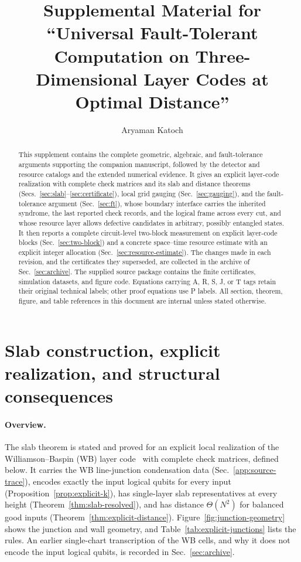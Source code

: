 \documentclass[aps,prx,reprint,superscriptaddress,nofootinbib,floatfix,longbibliography]{revtex4-2}
\theoremstyle{definition}
\begin{document}
\title{Supplemental Material for ``Universal Fault-Tolerant Computation on Three-Dimensional Layer Codes at Optimal Distance''}
\author{Aryaman Katoch}
\begin{abstract}
This supplement contains the complete geometric, algebraic, and fault-tolerance
arguments supporting the companion manuscript, followed by the detector and
resource catalogs and the extended numerical evidence.  It gives an explicit
layer-code realization with complete check matrices and its slab and distance
theorems (Secs.~\ref{sec:slab}--\ref{sec:certificate}), local grid gauging
(Sec.~\ref{sec:gauging}), and the fault-tolerance argument
(Sec.~\ref{sec:ft}), whose boundary interface carries the inherited syndrome,
the last reported check records, and the logical frame across every cut, and
whose resource layer allows defective candidates in arbitrary, possibly
entangled states.  It then reports a complete circuit-level two-block
measurement on explicit layer-code blocks (Sec.~\ref{sec:two-block}) and a
concrete space--time resource estimate with an explicit integer allocation
(Sec.~\ref{sec:resource-estimate}).  The changes made in each revision, and
the certificates they superseded, are collected in the archive of
Sec.~\ref{sec:archive}.  The supplied source package contains the finite
certificates, simulation datasets, and figure code.
Equations carrying A, R, S, J, or T tags retain their original technical labels;
other proof equations use P labels. All section, theorem, figure, and table
references in this document are internal unless stated otherwise.
\end{abstract}
\maketitle
\raggedbottom
\tableofcontents
\clearpage
\section{Slab construction, explicit realization, and structural consequences}
\label{sec:slab}

\paragraph{Overview.}
The slab theorem is stated and proved for an explicit local realization of
the Williamson--Baspin (WB) layer code~\cite{WilliamsonBaspinLayerCodes} with
complete check matrices, defined below.  It carries the WB line-junction
condensation data (Sec.~\ref{app:source-trace}), encodes exactly the input
logical qubits for every input (Proposition~\ref{prop:explicit-k}), has
single-layer slab representatives at every height
(Theorem~\ref{thm:slab-resolved}), and has distance $\Theta(N^2)$ for balanced
good inputs (Theorem~\ref{thm:explicit-distance}).
Figure~\ref{fig:junction-geometry} shows the junction and wall geometry, and
Table~\ref{tab:explicit-junctions} lists the rules.  An earlier single-chart
transcription of the WB cells, and why it does not encode the input logical
qubits, is recorded in Sec.~\ref{sec:archive}.
\end{document}
